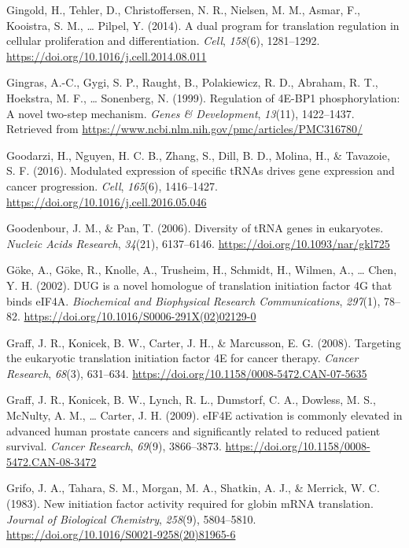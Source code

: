 \documentclass[12pt,openany]{book}
\begin{document}
\hypertarget{ref-Gingold2014}{}
Gingold, H., Tehler, D., Christoffersen, N. R., Nielsen, M. M., Asmar,
F., Kooistra, S. M., \ldots{} Pilpel, Y. (2014). A dual program for
translation regulation in cellular proliferation and differentiation.
\emph{Cell}, \emph{158}(6), 1281--1292.
\url{https://doi.org/10.1016/j.cell.2014.08.011}

\hypertarget{ref-Gingras1999}{}
Gingras, A.-C., Gygi, S. P., Raught, B., Polakiewicz, R. D., Abraham, R.
T., Hoekstra, M. F., \ldots{} Sonenberg, N. (1999). Regulation of 4E-BP1
phosphorylation: A novel two-step mechanism. \emph{Genes \&
Development}, \emph{13}(11), 1422--1437. Retrieved from
\url{https://www.ncbi.nlm.nih.gov/pmc/articles/PMC316780/}

\hypertarget{ref-Goodarzi2016}{}
Goodarzi, H., Nguyen, H. C. B., Zhang, S., Dill, B. D., Molina, H., \&
Tavazoie, S. F. (2016). Modulated expression of specific tRNAs drives
gene expression and cancer progression. \emph{Cell}, \emph{165}(6),
1416--1427. \url{https://doi.org/10.1016/j.cell.2016.05.046}

\hypertarget{ref-Goodenbour2006}{}
Goodenbour, J. M., \& Pan, T. (2006). Diversity of tRNA genes in
eukaryotes. \emph{Nucleic Acids Research}, \emph{34}(21), 6137--6146.
\url{https://doi.org/10.1093/nar/gkl725}

\hypertarget{ref-Goke2002}{}
Göke, A., Göke, R., Knolle, A., Trusheim, H., Schmidt, H., Wilmen, A.,
\ldots{} Chen, Y. H. (2002). DUG is a novel homologue of translation
initiation factor 4G that binds eIF4A. \emph{Biochemical and Biophysical
Research Communications}, \emph{297}(1), 78--82.
\url{https://doi.org/10.1016/S0006-291X(02)02129-0}

\hypertarget{ref-Graff2008}{}
Graff, J. R., Konicek, B. W., Carter, J. H., \& Marcusson, E. G. (2008).
Targeting the eukaryotic translation initiation factor 4E for cancer
therapy. \emph{Cancer Research}, \emph{68}(3), 631--634.
\url{https://doi.org/10.1158/0008-5472.CAN-07-5635}

\hypertarget{ref-Graff2009}{}
Graff, J. R., Konicek, B. W., Lynch, R. L., Dumstorf, C. A., Dowless, M.
S., McNulty, A. M., \ldots{} Carter, J. H. (2009). eIF4E activation is
commonly elevated in advanced human prostate cancers and significantly
related to reduced patient survival. \emph{Cancer Research},
\emph{69}(9), 3866--3873.
\url{https://doi.org/10.1158/0008-5472.CAN-08-3472}

\hypertarget{ref-Grifo1983}{}
Grifo, J. A., Tahara, S. M., Morgan, M. A., Shatkin, A. J., \& Merrick,
W. C. (1983). New initiation factor activity required for globin mRNA
translation. \emph{Journal of Biological Chemistry}, \emph{258}(9),
5804--5810. \url{https://doi.org/10.1016/S0021-9258(20)81965-6}
\end{document}
